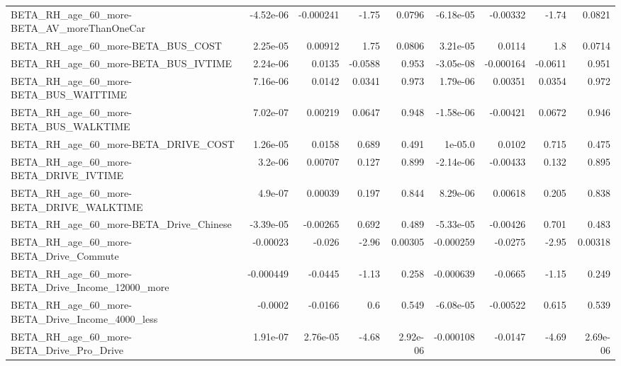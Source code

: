 \begin{tabular}{lrrrrrrrr}
BETA\_RH\_age\_60\_more-BETA\_AV\_moreThanOneCar         &   -4.52e-06 &    -0.000241 &     -1.75 &   0.0796 &  -6.18e-05 &    -0.00332 &        -1.74 &        0.0821 \\
BETA\_RH\_age\_60\_more-BETA\_BUS\_COST                  &    2.25e-05 &      0.00912 &      1.75 &   0.0806 &   3.21e-05 &      0.0114 &          1.8 &        0.0714 \\
BETA\_RH\_age\_60\_more-BETA\_BUS\_IVTIME                &    2.24e-06 &       0.0135 &   -0.0588 &    0.953 &  -3.05e-08 &   -0.000164 &      -0.0611 &         0.951 \\
BETA\_RH\_age\_60\_more-BETA\_BUS\_WAITTIME              &    7.16e-06 &       0.0142 &    0.0341 &    0.973 &   1.79e-06 &     0.00351 &       0.0354 &         0.972 \\
BETA\_RH\_age\_60\_more-BETA\_BUS\_WALKTIME              &    7.02e-07 &      0.00219 &    0.0647 &    0.948 &  -1.58e-06 &    -0.00421 &       0.0672 &         0.946 \\
BETA\_RH\_age\_60\_more-BETA\_DRIVE\_COST                &    1.26e-05 &       0.0158 &     0.689 &    0.491 &    1e-05.0 &      0.0102 &        0.715 &         0.475 \\
BETA\_RH\_age\_60\_more-BETA\_DRIVE\_IVTIME              &     3.2e-06 &      0.00707 &     0.127 &    0.899 &  -2.14e-06 &    -0.00433 &        0.132 &         0.895 \\
BETA\_RH\_age\_60\_more-BETA\_DRIVE\_WALKTIME            &     4.9e-07 &      0.00039 &     0.197 &    0.844 &   8.29e-06 &     0.00618 &        0.205 &         0.838 \\
BETA\_RH\_age\_60\_more-BETA\_Drive\_Chinese             &   -3.39e-05 &     -0.00265 &     0.692 &    0.489 &  -5.33e-05 &    -0.00426 &        0.701 &         0.483 \\
BETA\_RH\_age\_60\_more-BETA\_Drive\_Commute             &    -0.00023 &       -0.026 &     -2.96 &  0.00305 &  -0.000259 &     -0.0275 &        -2.95 &       0.00318 \\
BETA\_RH\_age\_60\_more-BETA\_Drive\_Income\_12000\_more   &   -0.000449 &      -0.0445 &     -1.13 &    0.258 &  -0.000639 &     -0.0665 &        -1.15 &         0.249 \\
BETA\_RH\_age\_60\_more-BETA\_Drive\_Income\_4000\_less    &     -0.0002 &      -0.0166 &       0.6 &    0.549 &  -6.08e-05 &    -0.00522 &        0.615 &         0.539 \\
BETA\_RH\_age\_60\_more-BETA\_Drive\_Pro\_Drive           &    1.91e-07 &     2.76e-05 &     -4.68 & 2.92e-06 &  -0.000108 &     -0.0147 &        -4.69 &      2.69e-06 \\

\end{tabular}
